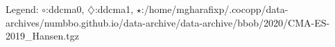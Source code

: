 Legend: {\color{NavyBlue}$\circ$}:ddcma0, {\color{Magenta}$\diamondsuit$}:ddcma1, {\color{Orange}$\star$}:/home/mgharafixp/.cocopp/data-archives/numbbo.github.io/data-archive/data-archive/bbob/2020/CMA-ES-2019\_Hansen.tgz
